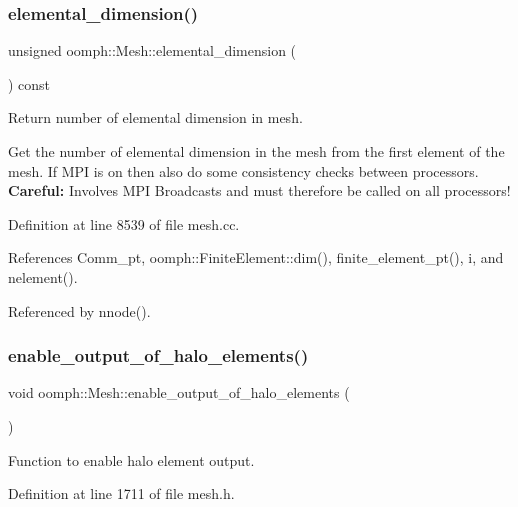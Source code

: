 \subsubsection{\texorpdfstring{elemental\+\_\+dimension()}{elemental\_dimension()}}
{\footnotesize\ttfamily unsigned oomph\+::\+Mesh\+::elemental\+\_\+dimension (\begin{DoxyParamCaption}{ }\end{DoxyParamCaption}) const}



Return number of elemental dimension in mesh. 

Get the number of elemental dimension in the mesh from the first element of the mesh. If M\+PI is on then also do some consistency checks between processors. {\bfseries Careful\+:} Involves M\+PI Broadcasts and must therefore be called on all processors! 

Definition at line 8539 of file mesh.\+cc.



References Comm\+\_\+pt, oomph\+::\+Finite\+Element\+::dim(), finite\+\_\+element\+\_\+pt(), i, and nelement().



Referenced by nnode().

\mbox{\label{classoomph_1_1Mesh_abf4093d461a063cd62d679738bf435e5}} 
\subsubsection{\texorpdfstring{enable\+\_\+output\+\_\+of\+\_\+halo\+\_\+elements()}{enable\_output\_of\_halo\_elements()}}
{\footnotesize\ttfamily void oomph\+::\+Mesh\+::enable\+\_\+output\+\_\+of\+\_\+halo\+\_\+elements (\begin{DoxyParamCaption}{ }\end{DoxyParamCaption})\hspace{0.3cm}{\ttfamily [inline]}}



Function to enable halo element output. 



Definition at line 1711 of file mesh.\+h.

